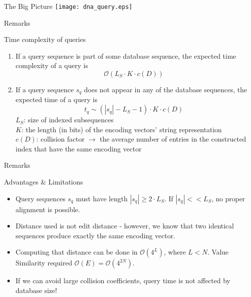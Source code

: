 \documentclass[9pt]{beamer}
\begin{document}
\begin{frame}{The Big Picture}
	\centering
	\texttt{[image: dna\_query.eps]}
\end{frame}
\begin{frame}{Remarks}
	\begin{block}{Time complexity of queries}
		\begin{enumerate}	
		\item If a query sequence is part of some database sequence, the expected time complexity of a query is 
		\[ \mathcal{O}(L_S \cdot K \cdot c(D)) \]
		\item If a query sequence $s_q$ does not appear in any of the database sequences, the expected time of a query is
		\[ 
			t_q \sim (|s_q| - L_S - 1) \cdot K \cdot c(D)
		\]
		$L_S$: size of indexed subsequences \\
		$K$: the length (in bits) of the encoding vectors' string representation \\
		$c(D)$: collision factor $ \to $ the average number of entries in the constructed index that have the same encoding vector
	\end{enumerate}
	\end{block}
\end{frame}
\begin{frame}{Remarks}
	\begin{block}{Advantages \& Limitations}
		\begin{itemize}
			\item<1-> Query sequences $s_q$ must have length $|s_q| \geq 2 \cdot L_S$. If $|s_q| << L_S$, no proper alignment is possible. 
			\item<2-> Distance used is not edit distance - however, we know that two identical sequences produce exactly the same encoding vector.
			\item<3-> Computing that distance can be done in $\mathcal{O}(4^{L})$, where $L < N$. Value Similarity required $\mathcal{O}(E) = \mathcal{O}(4^{2N})$.
			\item<4-> If we can avoid large collision coefficients, query time is not affected by database size!
		\end{itemize}
	\end{block}
\end{frame}
\end{document}
